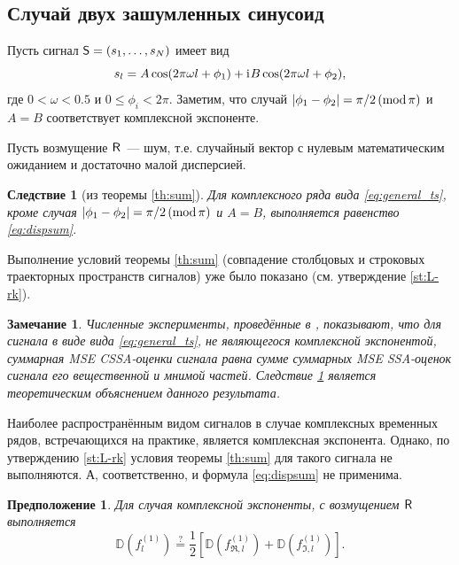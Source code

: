 \documentclass[specialist,
               substylefile = spbu.rtx,
               subf,href,colorlinks=true, 12pt]{disser}
\newtheorem{remark}{Замечание}
\newtheorem{corollary}{Следствие}
\newtheorem*{prop*}{Предположение}
\begin{document}
\subsection{Случай двух зашумленных синусоид}
Пусть сигнал $\textsf{S} = (s_1, \ldots, s_N)$ имеет вид
\begin{equation}
	\label{eq:general_ts}
	s_l = A\cos(2 \pi\omega l + \phi_1) + \mathrm{i}\mkern1mu B\cos(2 \pi\omega l + \phi_2),
\end{equation}
где $0<\omega < 0.5$ и $0\le\phi_i < 2\pi$.
Заметим, что случай $|\phi_1-\phi_2| = \pi/2\,(\mathop{\mathrm{mod}} \pi)$ и $A=B$ соответствует комплексной экспоненте.

Пусть возмущение $\textsf{R}$~--- шум, т.е. случайный вектор с нулевым математическим ожиданием и достаточно малой дисперсией.

\begin{corollary}[из теоремы {\ref{th:sum}}] \label{cor:harm}
	Для комплексного ряда вида \eqref{eq:general_ts}, кроме случая $|\phi_1-\phi_2| = \pi/2\,(\mathop{\mathrm{mod}} \pi)$ и $A=B$,  выполняется равенство \eqref{eq:dispsum}.
\end{corollary}
Выполнение условий теоремы {\ref{th:sum}} (совпадение столбцовых и строковых траекторных пространств сигналов) уже было показано (см. утверждение \ref{st:L-rk}).

\begin{remark}
	Численные эксперименты, проведённые в \cite{Golyandina.etal2013}, показывают, что для сигнала в виде вида \eqref{eq:general_ts}, не являющегося комплексной экспонентой, суммарная MSE CSSA-оценки сигнала равна сумме суммарных MSE SSA-оценок сигнала его вещественной и мнимой частей. Следствие \ref{cor:harm} является теоретическим объяснением данного результата.
\end{remark}

Наиболее распространённым видом сигналов в случае комплексных временных рядов, встречающихся на практике, является комплексная экспонента. Однако, по утверждению \ref{st:L-rk} условия теоремы \ref{th:sum} для такого сигнала не выполняются. А, соответственно, и формула \eqref{eq:dispsum} не применима.

\begin{prop*}
	Для случая комплексной экспоненты, с возмущением $\textsf{R}$ выполняется
	\begin{equation} \label{eq:expdisp}
		\mathbb{D}(f^{(1)}_l) \stackrel{?}{=} \frac{1}{2}[\mathbb{D}(f^{(1)}_{\Re, l}) + \mathbb{D}(f^{(1)}_{\Im, l})].
	\end{equation}
\end{prop*}
\end{document}
